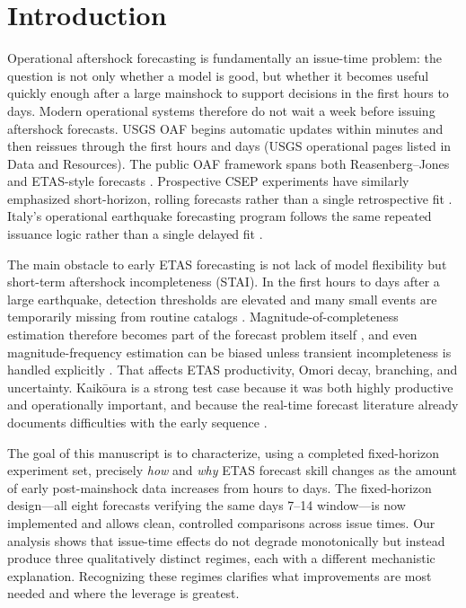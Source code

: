 \documentclass[12pt,letterpaper]{article}
\begin{document}
\section{Introduction}

Operational aftershock forecasting is fundamentally an issue-time problem: the
question is not only whether a model is good, but whether it becomes useful
quickly enough after a large mainshock to support decisions in the first hours
to days. Modern operational systems therefore do not wait a week before issuing
aftershock forecasts. USGS OAF begins automatic updates within minutes and then
reissues through the first hours and days (USGS operational pages listed in
Data and Resources). The public OAF framework spans both Reasenberg--Jones and
ETAS-style forecasts \cite{reasenberg1989,puertorico2022}.
Prospective CSEP experiments have similarly emphasized short-horizon,
rolling forecasts rather than a single retrospective fit \cite{zhuang2011,
csep_etas}.
Italy's operational earthquake forecasting program follows the same repeated
issuance logic rather than a single delayed fit
\cite{marzocchi2014,spassiani2023}.

The main obstacle to early ETAS forecasting is not lack of model flexibility but
short-term aftershock incompleteness (STAI). In the first hours to days after a
large earthquake, detection thresholds are elevated and many small events are
temporarily missing from routine catalogs
\cite{ogata2006,omi2013,omi2014,page2016,seif2017,lippiello2019,hainzl2024}.
Magnitude-of-completeness estimation therefore becomes part of the forecast
problem itself \cite{woessner2005}, and even magnitude-frequency estimation can
be biased unless transient incompleteness is handled explicitly
\cite{vandere1st2021}.
That affects ETAS productivity, Omori decay, branching, and uncertainty.
Kaik\={o}ura is a strong test case because it was both highly productive and
operationally important, and because the real-time forecast literature already
documents difficulties with the early sequence \cite{rhoades2017,harte2019}.

The goal of this manuscript is to characterize, using a completed fixed-horizon
experiment set, precisely \emph{how} and \emph{why} ETAS forecast skill changes
as the amount of early post-mainshock data increases from hours to days. The
fixed-horizon design---all eight forecasts verifying the same days 7--14
window---is now implemented and allows clean, controlled comparisons across
issue times. Our analysis shows that issue-time effects do not degrade
monotonically but instead produce three qualitatively distinct regimes, each
with a different mechanistic explanation. Recognizing these regimes clarifies
what improvements are most needed and where the leverage is greatest.
\end{document}
